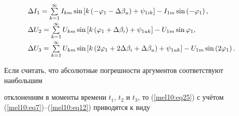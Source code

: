 \begin{equation}

\label{mel10:eq25}

\begin{array}{l}

\Delta I_1 = \sum\limits_{k=1}^\infty I_{km} \sin \left[ k \left( -\varphi

_1 -\Delta \beta _u \right)+ \psi_{1ik} \right] -I_{1m} \sin \left(

-\varphi_1 \right), \vspace{1mm}\\


\Delta U_2 =\sum \limits_{k=1}^\infty U_{km} \sin \left[ k\left( \varphi

_1 + \Delta \beta _i \right)+\psi_{1uk} \right] - U_{1m} \sin \varphi _1,\vspace{1mm}\\


\Delta U_3 =\sum \limits_{k=1}^\infty U_{km} \sin \left[ k\left( 2\varphi

_1 +2\Delta \beta _i +\Delta \beta _u  \right)+\psi _{1uk} \right]

-U_{1m} \sin \left( 2\varphi _1 \right).

\end{array}

\end{equation}



Если считать, что абсолютные погрешности аргументов соответствуют наибольшим

отклонениям в моменты времени $t_{1}$, $t_{2}$ и $t_{3}$, то (\ref{mel10:eq25}) с уч\"етом (\ref{mel10:eq7})--(\ref{mel10:eq12}) приводятся к виду

